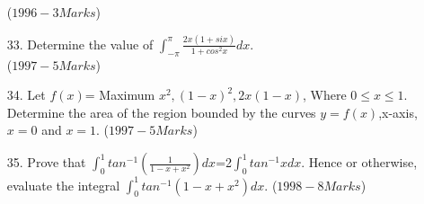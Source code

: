 \documentclass[journal,12pt,twocolumn]{IEEEtran}
\theoremstyle{remark}
\begin{document}
\begin{enumerate}
	\hfill{($1996-3 Marks$)}\\

\item[33.]  Determine the value of $\int_{-\pi}^{\pi}\frac{2x(1+six)}{1+cos^2x}dx$.\\


\hfill{($1997-5 Marks$)}

\item[34.]  Let $f(x)$= Maximum {$x^2,(1-x)^2,2x(1-x)$}, Where $0 \leq x \leq 1$. Determine the area of the region bounded by the curves $y=f(x)$,x-axis,$x=0$ and $x=1$.
\hfill{($1997-5 Marks$)}
\item[35.]  Prove that $\int_{0}^{1}tan^{-1}(\frac{1}{1-x+x^2})dx$=2$\int_{0}^{1} tan^{-1}xdx$. Hence or otherwise, evaluate the integral $\int_{0}^{1}tan^{-1}(1-x+x^2)dx.$
\hfill{($1998-8 Marks$)}

\end{enumerate}
\end{document}
